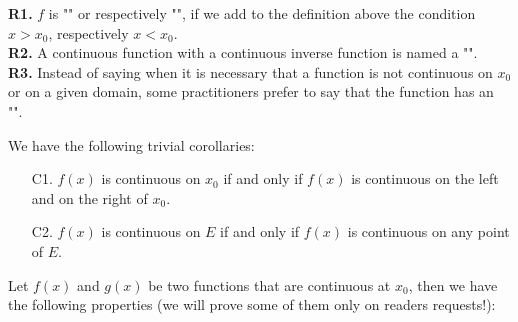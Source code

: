 	\begin{tcolorbox}[title=Remarks,arc=10pt,breakable,drop lifted shadow,
  skin=enhanced,
  skin first is subskin of={enhancedfirst}{arc=10pt,no shadow},
  skin middle is subskin of={enhancedmiddle}{arc=10pt,no shadow},
  skin last is subskin of={enhancedlast}{drop lifted shadow}]
	\textbf{R1. }$f$ is "" or respectively "", if we add to the definition above the condition $x>x_0$, respectively $x<x_0$.\\
	
	\textbf{R2.} A continuous function with a continuous inverse function is named a "".\\
	
	\textbf{R3.} Instead of saying when it is necessary that a function is not continuous on $x_0$ or on a given domain, some practitioners prefer to say that the function has an "".
	\end{tcolorbox}	
	We have the following trivial corollaries:
	\begin{enumerate}
		\item[C1.] $f(x)$ is continuous on $x_0$ if and only if $f(x)$ is continuous on the left and on the right of $x_0$.
		
		\item[C2.] $f(x)$ is continuous on $E$ if and only if $f(x)$ is continuous on any point of $E$.
	\end{enumerate}
	Let $f(x)$ and $g(x)$ be two functions that are continuous at $x_0$, then we have the following properties (we will prove some of them only on readers requests!):
